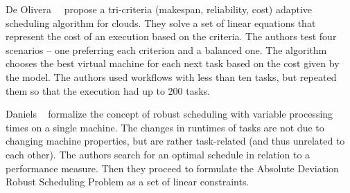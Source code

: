 \documentclass[conference]{IEEEtran}
\begin{document}
%
%
%

    De Olivera~\etal~\cite{de2012provenance} propose a tri-criteria (makespan, reliability, cost) adaptive scheduling algorithm
    for clouds.
    They solve a set of linear equations that represent the cost of an execution based on the criteria.
    The authors test four scenarios -- one preferring each criterion and a balanced one.
    The algorithm chooses the best virtual machine for each next task based on the cost given by the model.
    The authors used workflows with less than ten tasks, but repeated them so that the execution had up to 200 tasks.


    Daniels \etal~\cite{daniels1995robust} formalize the concept of robust scheduling with variable processing times
    on a single machine.
    The changes in runtimes of tasks are not due to changing machine properties, but are rather task-related (and thus unrelated to each other).
    The authors search for an optimal schedule
    in relation to a performance measure. %
    Then they proceed to formulate the Absolute Deviation Robust Scheduling Problem as a set of linear constraints.
\end{document}

